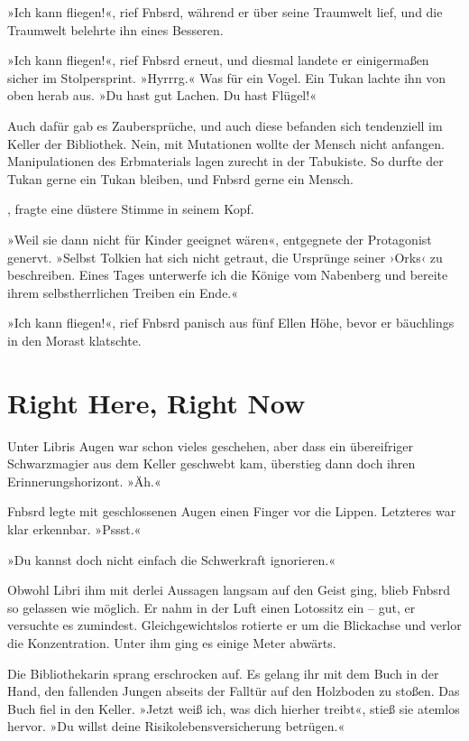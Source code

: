 »Ich kann fliegen!«, rief Fnbsrd, während er über seine Traumwelt lief, und die Traumwelt belehrte ihn eines Besseren.

»Ich kann fliegen!«, rief Fnbsrd erneut, und diesmal landete er einigermaßen sicher im Stolpersprint. »Hyrrrg.« Was für ein Vogel. Ein Tukan lachte ihn von oben herab aus. »Du hast gut Lachen. Du hast Flügel!«

Auch dafür gab es Zaubersprüche, und auch diese befanden sich tendenziell im Keller der Bibliothek. Nein, mit Mutationen wollte der Mensch nicht anfangen. Manipulationen des Erbmaterials lagen zurecht in der Tabukiste. So durfte der Tukan gerne ein Tukan bleiben, und Fnbsrd gerne ein Mensch.

, fragte eine düstere Stimme in seinem Kopf. 

»Weil sie dann nicht für Kinder geeignet wären«, entgegnete der Protagonist genervt. »Selbst Tolkien hat sich nicht getraut, die Ursprünge seiner ›Orks‹ zu beschreiben. Eines Tages unterwerfe ich die Könige vom Nabenberg und bereite ihrem selbstherrlichen Treiben ein Ende.«


»Ich kann fliegen!«, rief Fnbsrd panisch aus fünf Ellen Höhe, bevor er bäuchlings in den Morast klatschte.


\chapter{Right Here, Right Now}

Unter Libris Augen war schon vieles geschehen, aber dass ein übereifriger Schwarzmagier aus dem Keller geschwebt kam, überstieg dann doch ihren Erinnerungshorizont. »Äh.«

Fnbsrd legte mit geschlossenen Augen einen Finger vor die Lippen. Letzteres war klar erkennbar. »Pssst.«

»Du kannst doch nicht einfach die Schwerkraft ignorieren.«

Obwohl Libri ihm mit derlei Aussagen langsam auf den Geist ging, blieb Fnbsrd so gelassen wie möglich. Er nahm in der Luft einen Lotossitz ein – gut, er versuchte es zumindest. Gleichgewichtslos rotierte er um die Blickachse und verlor die Konzentration. Unter ihm ging es einige Meter abwärts.

Die Bibliothekarin sprang erschrocken auf. Es gelang ihr mit dem Buch in der Hand, den fallenden Jungen abseits der Falltür auf den Holzboden zu stoßen. Das Buch fiel in den Keller. »Jetzt weiß ich, was dich hierher treibt«, stieß sie atemlos hervor. »Du willst deine Risikolebensversicherung betrügen.«

